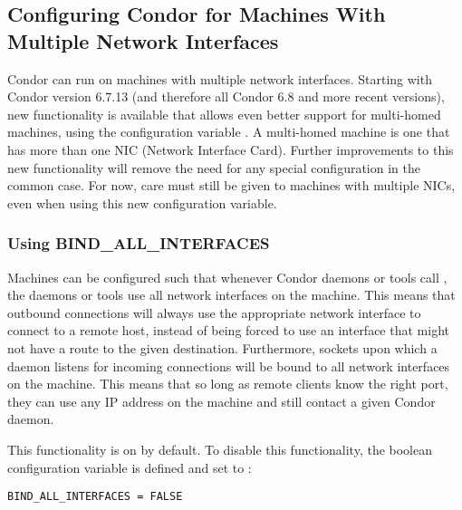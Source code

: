 \subsection{\label{sec:Multiple-Interfaces}Configuring Condor for
Machines With Multiple Network Interfaces } 


Condor can run on machines with
multiple network interfaces.
Starting with Condor version 6.7.13
(and therefore all Condor 6.8 and more recent versions),
new functionality is
available that allows even better support for multi-homed
machines, using the configuration variable .
A multi-homed machine is one that has more than one
NIC (Network Interface Card).
Further improvements to this new functionality will remove the need
for any special configuration in the common case.
For now, care
must still be given to machines with multiple NICs, even
when using this new configuration variable.


\subsubsection{\label{sec:Using-BindAllInterfaces}Using 
BIND\_ALL\_INTERFACES}

Machines can be configured such that
whenever Condor daemons or tools
call , the daemons or tools use all network interfaces on
the machine.
This means that outbound connections will always use the appropriate
network interface to connect to a remote host,
instead of being forced to use
an interface that might not have a route to the given destination.
Furthermore, sockets upon which a daemon listens for incoming connections 
will be bound to all network interfaces on the machine.
This means that so long as remote clients know the right port, they can
use any IP address on the machine and still contact a given Condor daemon.

This functionality is on by default.  To disable this functionality, 
the boolean configuration
variable
is defined and set to :

\begin{verbatim}
BIND_ALL_INTERFACES = FALSE
\end{verbatim}

